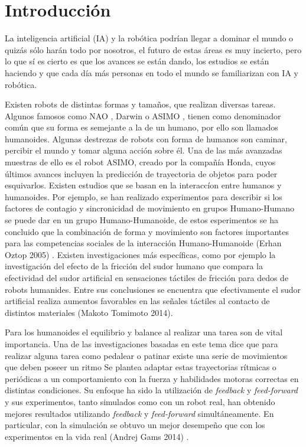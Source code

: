 
\chapter{Introducción}\label{intro}


\label{sect:justificacion}

La inteligencia artificial (IA) y la rob\'otica podr\'ian llegar a dominar el mundo o quiz\'as s\'olo har\'an todo por nosotros, el futuro de estas \'areas es muy incierto, pero lo que sí es cierto es que los avances se est\'an dando, los estudios se est\'an haciendo y que cada d\'ia m\'as personas en todo el mundo se familiarizan con IA y rob\'otica.

Existen robots de distintas formas y tama\~nos, que realizan diversas tareas. Algunos famosos como NAO \cite{nao}, Darwin \cite{darwin} o ASIMO \cite{asimo}, tienen como denominador com\'un que su forma es semejante a la de un humano, por ello son llamados humanoides. Algunas destrezas de robots con forma de humanos son caminar, percibir el mundo y tomar alguna acción sobre él. Una de las más avanzadas muestras de ello es el robot ASIMO, creado por la compañía Honda, cuyos últimos avances incluyen la predicción de trayectoria de objetos para poder esquivarlos. Existen estudios que se basan en la interacc\'ion entre humanos y humanoides. Por ejemplo, se han realizado experimentos para describir si los factores de contagio y sincronicidad de movimiento en grupos Humano-Humano se puede dar en un grupo Humano-Humanoide, de estos esperimentos se ha concluido que la combinaci\'on de forma y movimiento son factores importantes para las competencias sociales de la interacci\'on Humano-Humanoide (Erhan Oztop 2005) \cite{interacion}. 
Existen investigaciones más espec\'ificas, como por ejemplo la investigación del efecto de la fricci\'on del sudor humano que compara la efectividad del sudor artificial en sensaciones t\'actiles de fricci\'on para dedos de robots humanides. Entre sus conclusiones se encuentra que efectivamente el sudor artificial realiza aumentos favorables en las se\~nales t\'actiles al contacto de distintos materiales (Makoto Tomimoto 2014)\cite{sudor}.

Para los humanoides el equilibrio y balance al realizar una tarea son de vital importancia. Una de las investigaciones basadas en este tema dice que para realizar alguna tarea como pedalear o patinar existe una serie de movimientos que deben poseer un ritmo Se plantea adaptar estas trayectorias r\'itmicas o peri\'odicas a un comportamiento con la fuerza y habilidades motoras correctas en distintas condiciones. Su enfoque ha sido la utilizaci\'on de \textit{feedback} y \textit{feed-forward} y sus experimentos, tanto simulados como con un robot real, han obtenido mejores resultados utilizando \textit{feedback} y \textit{feed-forward} simult\'aneamente. En particular, con la simulaci\'on se obtuvo un mejor desempe\~no que con los experimentos en la vida real (Andrej Gams 2014) \cite{pedal}.

